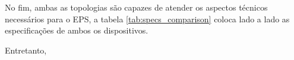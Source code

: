 \noindent
\begin{minipage}{\linewidth}
\label{fig:spv1040_block}
\end{minipage}

\noindent
\begin{minipage}{\linewidth}
\label{fig:spv1040_sample}
\end{minipage}

No fim, ambas as topologias são capazes de atender os aspectos técnicos necessários para o EPS, a tabela \ref{tab:specs_comparison} coloca lado a lado as especificações de ambos os dispositivos. 




Entretanto, 